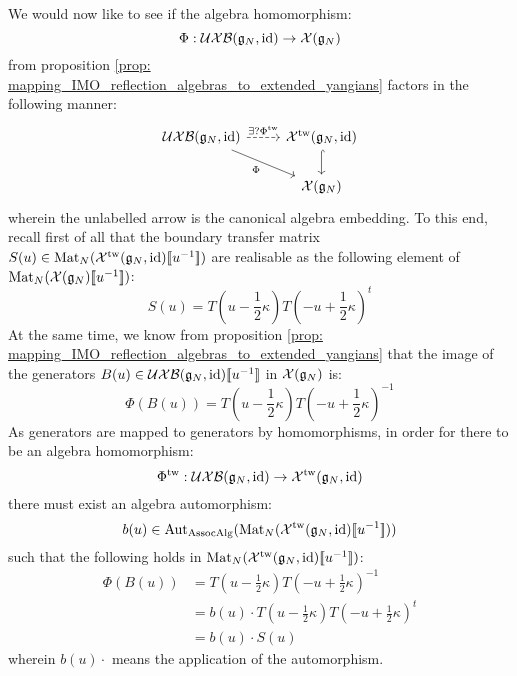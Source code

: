             We would now like to see if the algebra homomorphism:
                $$\Phi: \mathcal{UXB}(\mathfrak{g}_N, \mathrm{id}) \to \mathcal{X}(\mathfrak{g}_N)$$
            from proposition \ref{prop: mapping_IMO_reflection_algebras_to_extended_yangians} factors in the following manner:
                \begin{equation} \label{equation: mapping_IMO_reflection_algebras_to_extended_untwisted_yangians_via_extended_twisted_yangians}
                    \begin{tikzcd}
                	{\UXB(\g_N, \id)} & {\calX^{\tw}(\g_N, \id)} \\
                	& {\calX(\g_N)}
                	\arrow["{\exists ? \Phi^{\tw}}", dashed, from=1-1, to=1-2]
                	\arrow["\Phi"', from=1-1, to=2-2]
                	\arrow[hook, from=1-2, to=2-2]
                    \end{tikzcd}
                \end{equation}
            wherein the unlabelled arrow is the canonical algebra embedding. To this end, recall first of all that the boundary transfer matrix $S(u) \in \mathrm{Mat}_N(\mathcal{X}^{\mathrm{tw}}(\mathfrak{g}_N, \mathrm{id})[\![u^{-1}]\!])$ are realisable as the following element of $\mathrm{Mat}_N(\mathcal{X}(\mathfrak{g}_N)[\![u^{-1}]\!])$:
                $$S(u) = T\left(u - \frac12 \kappa\right) T\left(-u + \frac12 \kappa\right)^t$$
            At the same time, we know from proposition \ref{prop: mapping_IMO_reflection_algebras_to_extended_yangians} that the image of the generators $B(u) \in \mathcal{UXB}(\mathfrak{g}_N, \mathrm{id})[\![u^{-1}]\!]$ in $\mathcal{X}(\mathfrak{g}_N)$ is:
                $$\Phi( B(u) ) = T\left(u - \frac12 \kappa\right) T\left(-u + \frac12 \kappa\right)^{-1}$$
            As generators are mapped to generators by homomorphisms, in order for there to be an algebra homomorphism:
                $$\Phi^{\mathrm{tw}}: \mathcal{UXB}(\mathfrak{g}_N, \mathrm{id}) \to \mathcal{X}^{\mathrm{tw}}(\mathfrak{g}_N, \mathrm{id})$$
            there must exist an algebra automorphism:
                $$b(u) \in \mathrm{Aut}_{\mathrm{Assoc}\mathrm{Alg}}( \mathrm{Mat}_N(\mathcal{X}^{\mathrm{tw}}(\mathfrak{g}_N, \mathrm{id})[\![u^{-1}]\!]) )$$
            such that the following holds in $\mathrm{Mat}_N(\mathcal{X}^{\mathrm{tw}}(\mathfrak{g}_N, \mathrm{id})[\![u^{-1}]\!])$:
                $$
                    \begin{aligned}
                        \Phi(B(u)) & = T\left(u - \frac12 \kappa\right) T\left(-u + \frac12 \kappa\right)^{-1}
                        \\
                        & = b(u) \cdot T\left(u - \frac12 \kappa\right) T\left(-u + \frac12 \kappa\right)^t
                        \\
                        & = b(u) \cdot S(u)
                    \end{aligned}
                $$
            wherein $b(u) \cdot$ means the application of the automorphism.
            
